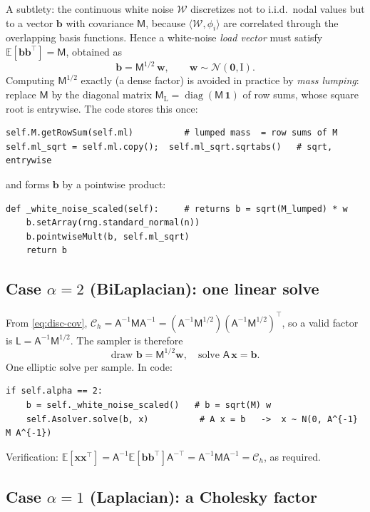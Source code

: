 \documentclass[11pt]{article}
\theoremstyle{definition}
\theoremstyle{plain}
\theoremstyle{remark}
\newcommand{\E}{\mathbb{E}}
\newcommand{\Nc}{\mathcal{N}}
\newcommand{\Cc}{\mathcal{C}}
\newcommand{\Wc}{\mathcal{W}}
\newcommand{\inner}[2]{\langle #1, #2 \rangle}
\newcommand{\Mmat}{\mathsf{M}}
\newcommand{\Amat}{\mathsf{A}}
\newcommand{\Lmat}{\mathsf{L}}
\newcommand{\bx}{\bm{x}}
\newcommand{\bb}{\bm{b}}
\newcommand{\bw}{\bm{w}}
\begin{document}
A subtlety: the continuous white noise $\Wc$ discretizes not to i.i.d.\ nodal
values but to a vector $\bb$ with covariance $\Mmat$, because
$\inner{\Wc}{\phi_i}$ are correlated through the overlapping basis functions.
Hence a white-noise \emph{load vector} must satisfy
$\E[\bb\bb^\top] = \Mmat$, obtained as
\begin{equation}
  \bb = \Mmat^{1/2}\,\bw, \qquad \bw \sim \Nc(\bm 0, \mathrm{I}).
\end{equation}
Computing $\Mmat^{1/2}$ exactly (a dense factor) is avoided in practice by
\emph{mass lumping}: replace $\Mmat$ by the diagonal matrix
$\Mmat_{\mathrm L} = \operatorname{diag}(\Mmat\,\bm 1)$ of row sums, whose
square root is entrywise. The code stores this once:
\begin{lstlisting}
self.M.getRowSum(self.ml)          # lumped mass  = row sums of M
self.ml_sqrt = self.ml.copy();  self.ml_sqrt.sqrtabs()   # sqrt, entrywise
\end{lstlisting}
and forms $\bb$ by a pointwise product:
\begin{lstlisting}
def _white_noise_scaled(self):     # returns b = sqrt(M_lumped) * w
    b.setArray(rng.standard_normal(n))
    b.pointwiseMult(b, self.ml_sqrt)
    return b
\end{lstlisting}

\subsection{Case $\alpha=2$ (BiLaplacian): one linear solve}

From \eqref{eq:disc-cov}, $\Cc_h = \Amat^{-1}\Mmat\Amat^{-1}
= (\Amat^{-1}\Mmat^{1/2})(\Amat^{-1}\Mmat^{1/2})^\top$, so a valid factor is
$\Lmat = \Amat^{-1}\Mmat^{1/2}$. The sampler is therefore
\begin{equation}
  \boxed{\;\text{draw } \bb = \Mmat^{1/2}\bw,\quad
          \text{solve } \Amat\,\bx = \bb.\;}
  \label{eq:sample-alpha2}
\end{equation}
One elliptic solve per sample. In code:
\begin{lstlisting}
if self.alpha == 2:
    b = self._white_noise_scaled()   # b = sqrt(M) w
    self.Asolver.solve(b, x)          # A x = b   ->  x ~ N(0, A^{-1} M A^{-1})
\end{lstlisting}
Verification: $\E[\bx\bx^\top]
= \Amat^{-1}\E[\bb\bb^\top]\Amat^{-\top}
= \Amat^{-1}\Mmat\Amat^{-1} = \Cc_h$, as required.

\subsection{Case $\alpha=1$ (Laplacian): a Cholesky factor}
\end{document}
